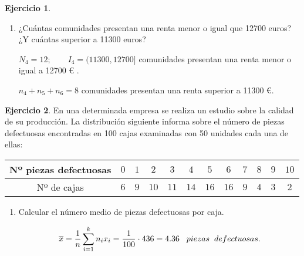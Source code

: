 \documentclass[a4paper, 12pt]{article}
\theoremstyle{definition}
\newtheorem{ej}{Ejercicio}
\begin{document}
\begin{ej}
\begin{enumerate}[label=\textit{\alph*)}]
    \item ¿Cuántas comunidades presentan una renta menor o igual que 12700 euros? ¿Y cuántas superior a 11300 euros?
    
    \(N_4 = 12 ; \qquad I_4 = (11300,12700] \)  comunidades presentan una renta menor o igual a 12700 \textup{\euro} .
    
    \(n_4 + n_5 + n_6 = 8\)  comunidades presentan una renta superior a 11300 \textup{\euro}.
    
\end{enumerate}


\end{ej}

\begin{ej}
En una determinada empresa se realiza un estudio sobre la calidad de su producción. La distribución siguiente informa sobre el número de piezas defectuosas encontradas en 100 cajas examinadas con 50 unidades cada una de ellas:

\begin{center}
    \begin{tabular}{|c|c|c|c|c|c|c|c|c|c|c|c|}
    \hline
     Nº piezas defectuosas & \(0\) & \(1\) & \(2\) & \(3\) & \(4\) & \(5\) & \(6\) & \(7\) & \(8\) & \(9\) & \(10\) \\
     \hline
     Nº de cajas & \(6\) & \(9\) & \(10\) & \(11\) & \(14\) & \(16\) & \(16\) & \(9\) & \(4\) & \(3\) & \(2\) \\
     \hline
    \end{tabular}
    
\end{center}

\begin{enumerate}[label=\textit{\alph*)}]
    \item Calcular el número medio de piezas defectuosas por caja.
    
    \[
    \overline{x} = \frac{1}{n} \sum_{i=1}^{k}n_ix_i = \frac{1}{100} \cdot 436 = 4.36 \hspace{0.3cm} piezas \hspace{0.2cm} defectuosas.
    \]
    

\end{enumerate}
\end{ej}
\end{document}
